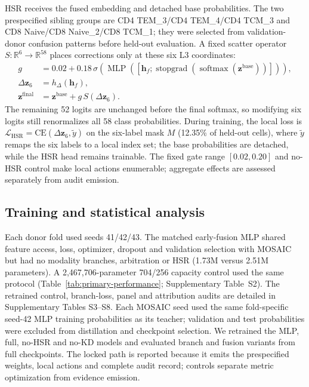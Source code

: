 \documentclass[unnumsec,webpdf,contemporary,large,numbered]{oup-authoring-template}
\begin{document}
HSR receives the fused embedding and detached base probabilities. The two prespecified sibling groups are CD4 TEM\_3/CD4 TEM\_4/CD4 TCM\_3 and CD8 Naive/CD8 Naive\_2/CD8 TCM\_1; they were selected from validation-donor confusion patterns before held-out evaluation. A fixed scatter operator $S:\mathbb{R}^{6}\rightarrow\mathbb{R}^{58}$ places corrections only at these six L3 coordinates:
\begin{equation}
\begin{aligned}
g &=0.02+0.18\,\sigma(\operatorname{MLP}([\mathbf{h}_{f};
\operatorname{stopgrad}(\operatorname{softmax}(\mathbf{z}^{\mathrm{base}}))])),\\
\Delta\mathbf{z}_{6}&=h_{\Delta}(\mathbf{h}_{f}),\\
\mathbf{z}^{\mathrm{final}}&=\mathbf{z}^{\mathrm{base}}+g\,S(\Delta\mathbf{z}_{6}).
\end{aligned}
\end{equation}
The remaining 52 logits are unchanged before the final softmax, so modifying six logits still renormalizes all 58 class probabilities. During training, the local loss is $\mathcal{L}_{\mathrm{HSR}}=\mathrm{CE}(\Delta\mathbf{z}_{6},\tilde y)$ on the six-label mask $M$ (12.35\% of held-out cells), where $\tilde y$ remaps the six labels to a local index set; the base probabilities are detached, while the HSR head remains trainable. The fixed gate range $[0.02,0.20]$ and no-HSR control make local actions enumerable; aggregate effects are assessed separately from audit emission.

\subsection{Training and statistical analysis}

Each donor fold used seeds 41/42/43. The matched early-fusion MLP shared feature access, loss, optimizer, dropout and validation selection with MOSAIC but had no modality branches, arbitration or HSR (1.73M versus 2.51M parameters). A 2,467,706-parameter 704/256 capacity control used the same protocol (Table~\ref{tab:primary-performance}; Supplementary Table~S2). The retrained control, branch-loss, panel and attribution audits are detailed in Supplementary Tables S3--S8. Each MOSAIC seed used the same fold-specific seed-42 MLP training probabilities as its teacher; validation and test probabilities were excluded from distillation and checkpoint selection. We retrained the MLP, full, no-HSR and no-KD models and evaluated branch and fusion variants from full checkpoints. The locked path is reported because it emits the prespecified weights, local actions and complete audit record; controls separate metric optimization from evidence emission.
\end{document}
